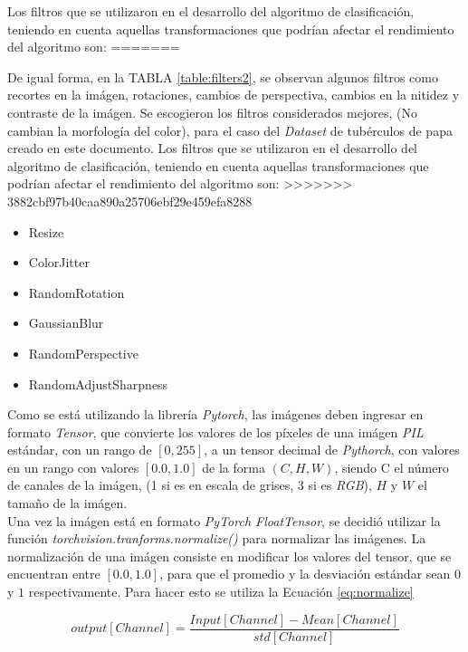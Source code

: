 			Los filtros que se utilizaron en el desarrollo del algoritmo de clasificación, teniendo en cuenta aquellas transformaciones que podrían afectar el rendimiento del algoritmo son:
=======

			De igual forma, en la TABLA \ref{table:filters2}, se observan algunos filtros como recortes en la imágen, rotaciones, cambios de perspectiva, cambios en la nitidez y contraste de la imágen. Se escogieron los filtros considerados mejores, (No cambian la morfología del color), para el caso del \textit{Dataset} de tubérculos de papa creado en este documento. Los filtros que se utilizaron en el desarrollo del algoritmo de clasificación, teniendo en cuenta aquellas transformaciones que podrían afectar el rendimiento del algoritmo son:
>>>>>>> 3882cbf97b40caa890a25706ebf29e459efa8288
			
			\begin{itemize}
				\item Resize
				\item ColorJitter
				\item RandomRotation
				\item GaussianBlur
				\item RandomPerspective
				\item RandomAdjustSharpness
			\end{itemize}

			Como se está utilizando la librería \textit{Pytorch}, las imágenes deben ingresar en formato \textit{Tensor}, que convierte los valores de los píxeles de una imágen \textit{PIL} estándar, con un rango de $[0, 255]$,  a un tensor decimal de \textit{Pythorch}, con valores en un rango con valores $[0.0, 1.0]$ de la forma  $(C, H, W)$, siendo C el número de canales de la imágen, (1 si es en escala de grises, 3 si es \textit{RGB}), $H$ y $W$ el tamaño de la imágen. \\
			
			Una vez la imágen está en formato \textit{PyTorch FloatTensor}, se decidió utilizar la función \textit{torchvision.tranforms.normalize()} para normalizar las imágenes. La normalización de una imágen consiste en modificar los valores del tensor, que se encuentran entre $[0.0, 1.0]$, para que el promedio y la desviación estándar sean $0$ y $1$ respectivamente. Para hacer esto se utiliza la Ecuación \ref{eq:normalize} \cite{Pytorch}
			
			\begin{equation}
				{output[Channel]=\frac{Input[Channel]-Mean[Channel]}{std[Channel]}}
				\label{eq:normalize}
			\end{equation}


